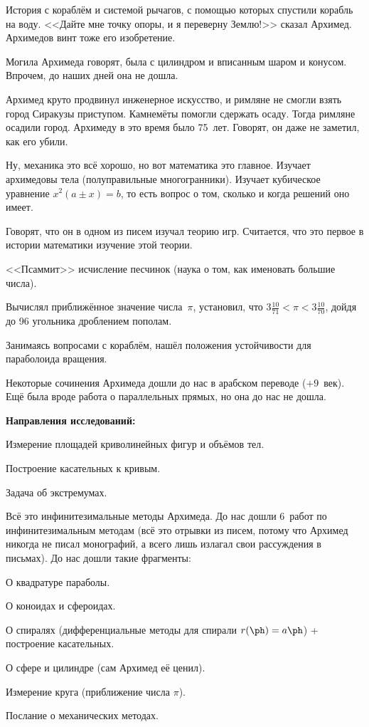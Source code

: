 \documentclass[a4paper,oneside,fleqn,10pt]{article}
\begin{document}
История с кораблём и системой рычагов, с помощью которых спустили корабль на воду.
<<Дайте мне точку опоры, и я переверну Землю!>> сказал Архимед.
Архимедов винт тоже его изобретение.

Могила Архимеда говорят, была с цилиндром и вписанным шаром и конусом.
Впрочем, до наших дней она не дошла.

Архимед круто продвинул инженерное искусство, и римляне не смогли взять город Сиракузы приступом.
Камнемёты помогли сдержать осаду. Тогда римляне осадили город.
Архимеду в это время было 75~лет. Говорят, он даже не заметил, как его убили.

Ну, механика это всё хорошо, но вот математика это главное.
Изучает архимедовы тела (полуправильные многогранники).
Изучает кубическое уравнение $x^2 (a\pm x) = b$, то есть вопрос о том,
сколько и когда решений оно имеет.

Говорят, что он в одном из писем изучал теорию игр. Считается, что это первое в истории
математики изучение этой теории.

<<Псаммит>> исчисление песчинок (наука о том, как именовать большие числа).

Вычислял приближённое значение числа~$\pi$, установил, что
$3\frac{10}{71} < \pi < 3\frac{10}{70}$,  дойдя до 96 угольника дроблением пополам.

Занимаясь вопросами с кораблём, нашёл положения устойчивости для параболоида вращения.

Некоторые сочинения Архимеда дошли до нас в арабском переводе  ($+9$~век).
Ещё была вроде работа о параллельных прямых, но она до нас не дошла.

\textbf{Направления исследований:}

\begin{items}{-2}
\item Измерение площадей криволинейных фигур и объёмов тел.
\item Построение касательных к кривым.
\item Задача об экстремумах.
\end{items}

Всё это инфинитезимальные методы Архимеда. До нас дошли 6~работ по инфинитезимальным
методам (всё это отрывки из писем, потому что Архимед никогда не писал монографий,
а всего лишь излагал свои рассуждения в письмах). До нас дошли такие фрагменты:

\begin{nums}{-2}
\item О квадратуре параболы.
\item О коноидах и сфероидах.
\item О спиралях (дифференциальные методы для спирали $r(\ph) = a\ph$) + построение касательных.
\item О сфере и цилиндре (сам Архимед её ценил).
\item Измерение круга (приближение числа $\pi$).
\item Послание  о механических методах.
\end{nums}
\end{document}
